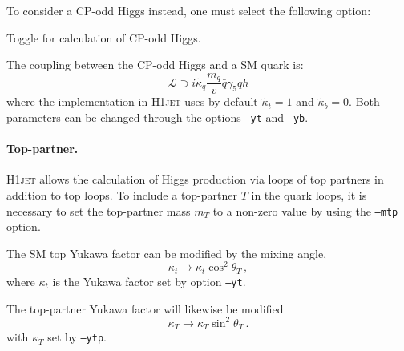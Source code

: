\documentclass[12pt]{article}
\begin{document}
\noindent
To consider a CP-odd Higgs instead, one must select the following option: 
\begin{description}[labelindent=\parindent, labelwidth =\widthof{\bfseries9999999999999999999999}, leftmargin = !] 
	\item[\texttt{--cpodd}] Toggle for calculation of CP-odd Higgs. 
\end{description}
The coupling between the CP-odd Higgs and a SM quark is: 
\begin{equation}
   \mathcal{L} \supset i \tilde{\kappa}_q \frac{m_q}{v} \bar{q} \gamma_5 q h
\end{equation}
where the implementation in \textsc{H1jet} uses by default $\tilde{\kappa}_t = 1$ and $\tilde{\kappa}_b = 0$. Both parameters can be changed through the options \texttt{--yt} and \texttt{--yb}. 

\paragraph{Top-partner.} \textsc{H1jet} allows the calculation of
Higgs production via loops of top partners in addition to top loops.
To include a top-partner $T$ in the quark loops, it is necessary
to set the top-partner mass $m_T$ to a non-zero value by using the
\texttt{--mtp} option.

The SM top Yukawa factor can be modified by the mixing angle, 
\begin{equation}
   \kappa_t \rightarrow \kappa_t \cos^2\theta_T \,, 
\end{equation} 
where $\kappa_t$ is the Yukawa factor set by option \texttt{--yt}. 

The top-partner Yukawa factor will likewise be modified 
\begin{equation}
   \kappa_T \rightarrow \kappa_T \sin^2\theta_T \,. 
\end{equation} 
with $\kappa_T$ set by \texttt{--ytp}.
\end{document}
